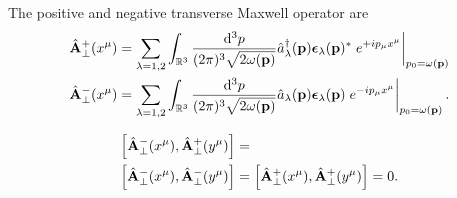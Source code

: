 \begin{definition}\label{thm:qmw_transverse_pn}
	The positive and negative transverse Maxwell operator are
	\begin{align}
		\label{eq:qmw_transverse_pn}
		\hat{\vb{A}}^+_\perp(x^\mu)
		&=
		\sum_{\lambda=1,2}
		\int_{\mathbb{R}^3}\frac{\dd[3]{p}}{(2\pi)^3\sqrt{2\omega(\vb{p})}}
		\hat{a}_\lambda^\dagger(\vb{p})
		\boldsymbol{\epsilon}_\lambda(\vb{p})^*
		\eval{e^{+ip_\mu x^\mu}}_{p_0=\omega(\vb{p})}
		\\
		\hat{\vb{A}}^-_\perp(x^\mu)
		&=
		\sum_{\lambda=1,2}
		\int_{\mathbb{R}^3}\frac{\dd[3]{p}}{(2\pi)^3\sqrt{2\omega(\vb{p})}}
		\hat{a}_\lambda(\vb{p})
		\boldsymbol{\epsilon}_\lambda(\vb{p})
		\eval{e^{-ip_\mu x^\mu}}_{p_0=\omega(\vb{p})}
		.
	\end{align}
\end{definition}
\begin{lemma}\label{thm:qmw_comm_pn}
	\begin{align}
		\label{eq:qmw_comm_ac}
		\comm{\hat{\vb{A}}_\perp^-(x^\mu)}{\hat{\vb{A}}_\perp^+(y^\mu)}
		&=
		\\
		\comm{\hat{\vb{A}}_\perp^-(x^\mu)}{\hat{\vb{A}}_\perp^-(y^\mu)}
		&=
		\comm{\hat{\vb{A}}_\perp^+(x^\mu)}{\hat{\vb{A}}_\perp^+(y^\mu)}
		=
		0
		.
	\end{align}
\end{lemma}

